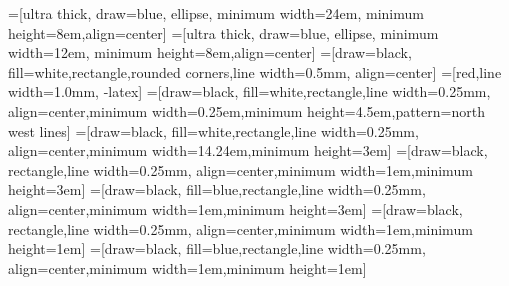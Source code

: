 
=[ultra thick, draw=blue, ellipse, minimum width=24em,
    minimum height=8em,align=center]
=[ultra thick, draw=blue, ellipse, minimum width=12em,
    minimum height=8em,align=center]
=[draw=black, fill=white,rectangle,rounded corners,line width=0.5mm,%
	  align=center]
=[red,line width=1.0mm, -latex]
=[draw=black, fill=white,rectangle,line width=0.25mm,%
	  align=center,minimum width=0.25em,minimum height=4.5em,pattern=north west lines]
=[draw=black, fill=white,rectangle,line width=0.25mm,%
	  align=center,minimum width=14.24em,minimum height=3em]
=[draw=black, rectangle,line width=0.25mm,%
	  align=center,minimum width=1em,minimum height=3em]
=[draw=black, fill=blue,rectangle,line width=0.25mm,%
	  align=center,minimum width=1em,minimum height=3em]
=[draw=black, rectangle,line width=0.25mm,%
	  align=center,minimum width=1em,minimum height=1em]
=[draw=black, fill=blue,rectangle,line width=0.25mm,%
	  align=center,minimum width=1em,minimum height=1em]

